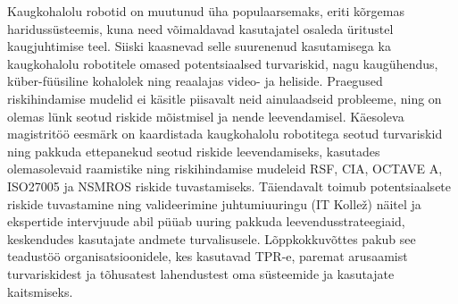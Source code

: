 Kaugkohalolu robotid on muutunud üha populaarsemaks, eriti kõrgemas haridussüsteemis, kuna need võimaldavad kasutajatel osaleda üritustel
kaugjuhtimise teel. Siiski kaasnevad selle suurenenud kasutamisega ka kaugkohalolu robotitele omased potentsiaalsed turvariskid, nagu
kaugühendus, küber-füüsiline kohalolek ning reaalajas video- ja heliside. Praegused riskihindamise mudelid ei käsitle
piisavalt neid ainulaadseid probleeme, ning on olemas lünk seotud riskide mõistmisel ja nende leevendamisel.
Käesoleva magistritöö eesmärk on kaardistada kaugkohalolu robotitega seotud turvariskid ning pakkuda ettepanekud seotud riskide
leevendamiseks, kasutades olemasolevaid raamistike ning riskihindamise mudeleid RSF, CIA, OCTAVE A, ISO27005 ja NSMROS riskide
tuvastamiseks. Täiendavalt toimub potentsiaalsete riskide tuvastamine ning valideerimine juhtumiuuringu (IT Kollež) näitel ja ekspertide
intervjuude abil püüab uuring pakkuda leevendusstrateegiaid, keskendudes kasutajate andmete turvalisusele. Lõppkokkuvõttes pakub see
teadustöö organisatsioonidele, kes kasutavad TPR-e, paremat arusaamist turvariskidest ja tõhusatest lahendustest oma süsteemide ja kasutajate kaitsmiseks.
